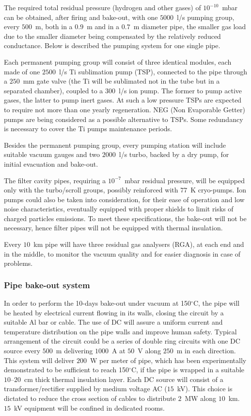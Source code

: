 The required total residual pressure (hydrogen and other gases) of $10^{-10}$~mbar can be obtained, after firing and bake-out, with one $5000$~l/s pumping group, every $500$~m, both in a $0.9$~m and in a $0.7$~m diameter pipe, the smaller gas load due to the smaller diameter being compensated by the relatively reduced conductance. Below is described the pumping system for one single pipe. 

Each permanent pumping group will consist of three identical modules, each made of one $2500$~l/s Ti sublimation pump (TSP), connected to the pipe through a $250$~mm gate valve (the Ti will be sublimated not in the tube but in a separated chamber), coupled to a $300$~l/s ion pump. The former to pump active gases, the latter to pump inert gases. At such a low pressure TSPs are expected to require not more than one yearly regeneration. NEG (Non Evaporable Getter) pumps are being considered as a possible alternative to TSPs. Some redundancy is necessary to cover the Ti pumps maintenance periods.

Besides the permanent pumping group, every pumping station will include suitable vacuum gauges and two $2000$~l/s turbo, backed by a dry pump, for initial evacuation and bake-out. 

The filter cavity pipes, requiring a $10^{-7}$~mbar residual pressure, will be equipped only with the turbo/scroll groups, possibly reinforced with $77$~K cryo-pumps. Ion pumps could also be taken into consideration, for their ease of operation and low noise characteristics, eventually equipped with proper shields to limit risks of charged particles emissions. To meet these specifications, the bake-out will not be necessary, hence filter pipes will not be equipped with thermal insulation.

Every $10$~km pipe will have three residual gas analysers (RGA), at each end and in the middle, to monitor the vacuum quality and for easier diagnosis in case of problems.

\subsubsection{Pipe bake-out system} 
In order to perform the 10-days bake-out under vacuum at 150$^{\circ}$C, the pipe will be heated by electrical current flowing in its walls, closing the circuit by a suitable Al bar or cable. The use of DC will assure a uniform current and temperature distribution on the pipe walls and improve human safety. Typical arrangement of the circuit could be a series of double ring circuits with one DC source every $500$~m delivering $1000$~A at $50$~V along $250$~m in each direction. This system will deliver $200$~W per meter of pipe, which has been experimentally demonstrated to be sufficient to reach 150$^{\circ}$C, if the pipe is wrapped in a suitable $10$--$20$~cm thick thermal insulation layer. Each DC source will consist of a transformer/rectifier supplied by medium voltage AC ($15$~kV). This choice is dictated to reduce the cross section of cables to distribute $2$~MW along $10$~km. $15$~kV equipment will be confined in dedicated rooms. 

